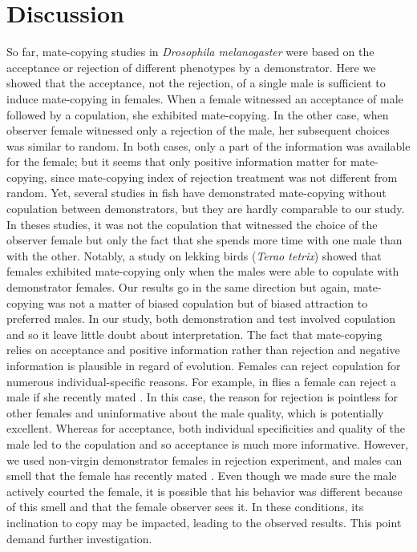 \documentclass[a4paper, 12pt]{article}
\begin{document}
\section{Discussion}

So far, mate-copying studies in \textit{Drosophila melanogaster} were based on the acceptance or rejection of different phenotypes by a demonstrator.
Here we showed that the acceptance, not the rejection, of a single male is sufficient to induce mate-copying in females. 
When a female witnessed an acceptance of male followed by a copulation, she exhibited mate-copying. 
In the other case, when observer female witnessed only a rejection of the male, her subsequent choices was similar to random. 
In both cases, only a part of the information was available for the female; but it seems that only positive information matter for mate-copying, since mate-copying index of rejection treatment was not different from random.
Yet, several studies in fish have demonstrated mate-copying without copulation between demonstrators, but they are hardly comparable to our study. 
In theses studies, it was not the copulation that witnessed the choice of the observer female but only the fact that she spends more time with one male than with the other\parencite{dugatkin_lee_alan_reversal_1992,galef_mate-choice_1998}. 
Notably, a study on lekking birds (\textit{Terao tetrix})  showed that females exhibited mate-copying only when the males were able to copulate with demonstrator females. Our results go in the same direction but again, mate-copying was not a matter of biased copulation but of biased attraction to preferred males. In our study, both demonstration and test involved copulation and so it leave little doubt about interpretation. 
The fact that mate-copying relies on acceptance and positive information rather than rejection and negative information is plausible in regard of evolution.
Females can reject copulation for numerous individual-specific reasons. For example, in flies a female can reject a male if she recently mated \parencite{chapman_sex_2003}. 
In this case, the reason for rejection is pointless for other females and uninformative about the male quality, which is potentially excellent.
Whereas for acceptance, both individual specificities and quality of the male led to the copulation and so acceptance is much more informative.
However, we used non-virgin demonstrator females in rejection experiment, and males can smell that the female has recently mated \parencite{jallon_few_1984}. 
Even though we made sure the male actively courted the female, it is possible that his behavior was different because of this smell and that the female observer sees it. 
In these conditions, its inclination to copy may be impacted, leading to the observed results. 
This point demand further investigation.
\end{document}
